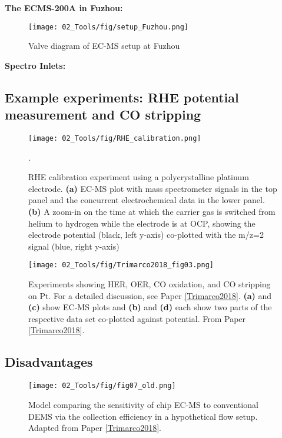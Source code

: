 \textbf{\large The ECMS-200A in Fuzhou:}

\begin{figure}[h!]
	\centering
	\texttt{[image: 02\_Tools/fig/setup\_Fuzhou.png]}
	\caption{Valve diagram of EC-MS setup at Fuzhou}
	\label{fig:Fuzhou}
\end{figure}

\textbf{\large Spectro Inlets:}


\subsection{Example experiments: RHE potential measurement and CO stripping}\label{subsec:examples}

\begin{figure}[h!]
	\centering
	\texttt{[image: 02\_Tools/fig/RHE\_calibration.png]}
	\caption{RHE calibration experiment using a polycrystalline platinum electrode. \textbf{(a)} EC-MS plot with mass spectrometer signals in the top panel and the concurrent electrochemical data in the lower panel. \textbf{(b)} A zoom-in on the time at which the carrier gas is switched from helium to hydrogen while the electrode is at OCP, showing the electrode potential (black, left y-axis) co-plotted with the m/z=2 signal (blue, right y-axis)}.
	\label{fig:RHE_cal}
\end{figure}

\begin{figure}[h!]
	\centering
	\texttt{[image: 02\_Tools/fig/Trimarco2018\_fig03.png]}
	\caption{Experiments showing HER, OER, CO oxidation, and CO stripping on Pt. For a detailed discussion, see Paper \ref{Trimarco2018}. \textbf{(a)} and \textbf{(c)} show EC-MS plots and \textbf{(b)} and \textbf{(d)} each show two parts of the respective data set co-plotted against potential. From Paper \ref{Trimarco2018}.}
	\label{fig:fig3}
\end{figure}

\subsection{Disadvantages}\label{subsec:disadvantages}


\begin{figure}[h!]
	\texttt{[image: 02\_Tools/fig/fig07\_old.png]}
	\caption{Model comparing the sensitivity of chip EC-MS to conventional DEMS via the collection efficiency in a hypothetical flow setup. Adapted from Paper \ref{Trimarco2018}.}
	\label{fig:sensitivity}
\end{figure}

